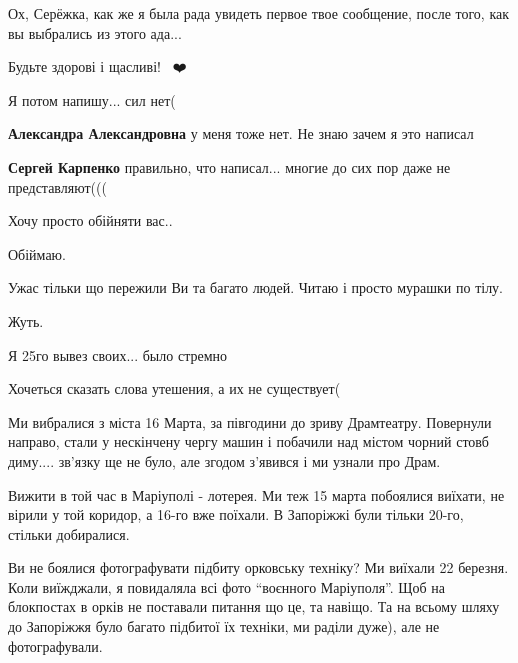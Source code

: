 
Ох, Серёжка, как же я была рада увидеть первое твое сообщение, после того, как
вы выбрались из этого ада...


Будьте здорові і щасливі!🙏🙏🙏❤️


Я потом напишу... сил нет(

\begin{itemize} %
\textbf{Александра Александровна} у меня тоже нет. Не знаю зачем я это написал

\textbf{Сергей Карпенко} правильно, что написал... многие до сих пор даже не представляют(((
\end{itemize} %


Хочу просто обійняти вас..


Обіймаю.


Ужас тільки що пережили Ви та багато людей. Читаю і просто мурашки по тілу.


Жуть.


Я 25го вывез своих... было стремно


Хочеться сказать слова утешения, а их не существует(


Ми вибралися з міста 16 Марта, за півгодини до зриву Драмтеатру. Повернули
направо, стали у нескінчену чергу машин і побачили над містом чорний стовб
диму.... зв'язку ще не було, але згодом з'явився і ми узнали про Драм.


Вижити в той час в Маріуполі - лотерея. Ми теж 15 марта побоялися виїхати, не
вірили у той коридор, а 16-го вже поїхали. В Запоріжжі були тільки 20-го,
стільки добиралися.


Ви не боялися фотографувати підбиту орковську техніку? Ми виїхали 22 березня.
Коли виїжджали, я повидаляла всі фото \enquote{воєнного Маріуполя}. Щоб на блокпостах в
орків не поставали питання що це, та навіщо. Та на всьому шляху до Запоріжжя
було багато підбитої їх техніки, ми раділи дуже), але не фотографували.

